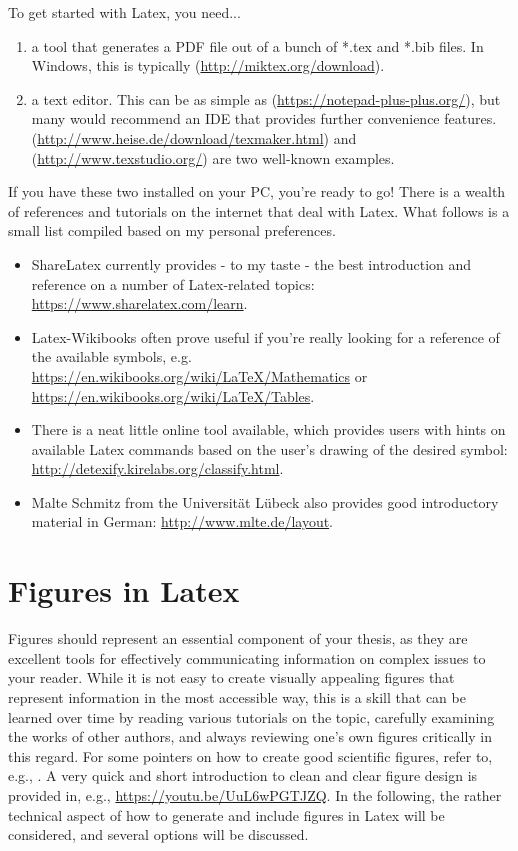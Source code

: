 To get started with Latex, you need...
\begin{enumerate}
\item a tool that generates a PDF file out of a bunch of *.tex and *.bib files.
In Windows, this is typically  (\url{http://miktex.org/download}).
\item a text editor. This can be as simple as  (\url{https://notepad-plus-plus.org/}), but many would recommend an IDE that provides further convenience features.  (\url{http://www.heise.de/download/texmaker.html}) and  (\url{http://www.texstudio.org/}) are two well-known examples.
\end{enumerate}
If you have these two installed on your PC, you're ready to go!
There is a wealth of references and tutorials on the internet that deal with Latex.
What follows is a small list compiled based on my personal preferences.
\begin{itemize}
\item ShareLatex currently provides - to my taste - the best introduction and reference on a number of Latex-related topics: \url{https://www.sharelatex.com/learn}.
\item Latex-Wikibooks often prove useful if you're really looking for a reference of the available symbols, e.g. \url{https://en.wikibooks.org/wiki/LaTeX/Mathematics} or \url{https://en.wikibooks.org/wiki/LaTeX/Tables}.
\item There is a neat little online tool available, which provides users with hints on available Latex commands based on the user's drawing of the desired symbol: \url{http://detexify.kirelabs.org/classify.html}.
\item Malte Schmitz from the Universität Lübeck also provides good introductory material in German: \url{http://www.mlte.de/layout}.
\end{itemize}


\section{Figures in Latex}
Figures should represent an essential component of your thesis, as they are excellent tools for effectively communicating information on complex issues to your reader.
While it is not easy to create visually appealing figures that represent information in the most accessible way, this is a skill that can be learned over time by reading various tutorials on the topic, carefully examining the works of other authors, and always reviewing one's own figures critically in this regard.
For some pointers on how to create good scientific figures, refer to, e.g., \textcite{Tufte1990, Ware2008, Few2012, Rougier2014}.
A very quick and short introduction to clean and clear figure design is provided in, e.g., \url{https://youtu.be/UuL6wPGTJZQ}.
In the following, the rather technical aspect of how to generate and include figures in Latex will be considered, and several options will be discussed.

